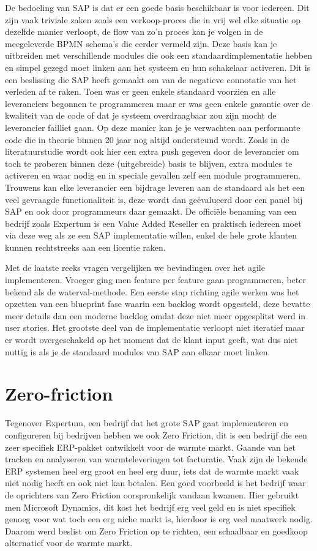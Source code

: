 De bedoeling van SAP is dat er een goede basis beschikbaar is voor iedereen. Dit zijn vaak triviale zaken zoals een verkoop-proces die in vrij wel elke situatie op dezelfde manier verloopt, de flow van zo'n proces kan je volgen in de meegeleverde BPMN schema's die eerder vermeld zijn. Deze basis kan je uitbreiden met verschillende modules die ook een standaardimplementatie hebben en simpel gezegd moet linken aan het systeem en hun schakelaar activeren. Dit is een beslissing die SAP heeft gemaakt om van de negatieve connotatie van het verleden af te raken. Toen was er geen enkele standaard voorzien en alle leveranciers begonnen te programmeren maar er was geen enkele garantie over de kwaliteit van de code of dat je systeem overdraagbaar zou zijn mocht de leverancier failliet gaan. Op deze manier kan je je verwachten aan performante code die in theorie binnen 20 jaar nog altijd ondersteund wordt. Zoals in de literatuurstudie wordt ook hier een extra push gegeven door de leverancier om toch te proberen binnen deze (uitgebreide) basis te blijven, extra modules te activeren en waar nodig en in speciale gevallen zelf een module programmeren. Trouwens kan elke leverancier een bijdrage leveren aan de standaard als het een veel gevraagde functionaliteit is, deze wordt dan geëvalueerd door een panel bij SAP en ook door programmeurs daar gemaakt. De officiële benaming van een bedrijf zoals Expertum is een Value Added Reseller en praktisch iedereen moet via deze weg als ze een SAP implementatie willen, enkel de hele grote klanten kunnen rechtstreeks aan een licentie raken.

Met de laatste reeks vragen vergelijken we bevindingen over het agile implementeren. Vroeger ging men feature per feature gaan programmeren, beter bekend als de waterval-methode. Een eerste stap richting agile werken was het opzetten van een blueprint fase waarin een backlog wordt opgesteld, deze bevatte meer details dan een moderne backlog omdat deze niet meer opgesplitst werd in user stories. Het grootste deel van de implementatie verloopt niet iteratief maar er wordt overgeschakeld op het moment dat de klant input geeft, wat dus niet nuttig is als je de standaard modules van SAP aan elkaar moet linken.


\section{Zero-friction}

Tegenover Expertum, een bedrijf dat het grote SAP gaat implementeren en configureren bij bedrijven hebben we ook Zero Friction, dit is een bedrijf die een zeer specifiek ERP-pakket ontwikkelt voor de warmte markt. Gaande van het tracken en analyseren van warmteleveringen tot facturatie. Vaak zijn de bekende ERP systemen heel erg groot en heel erg duur, iets dat de warmte markt vaak niet nodig heeft en ook niet kan betalen. Een goed voorbeeld is het bedrijf waar de oprichters van Zero Friction oorspronkelijk vandaan kwamen. Hier gebruikt men Microsoft Dynamics, dit kost het bedrijf erg veel geld en is niet specifiek genoeg voor wat toch een erg niche markt is, hierdoor is erg veel maatwerk nodig. Daarom werd beslist om Zero Friction op te richten, een schaalbaar en goedkoop alternatief voor de warmte markt.

